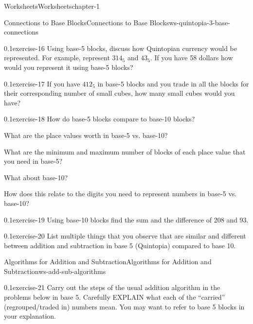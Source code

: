 \documentclass[twoside,11pt,]{book}
\begin{document}
\begin{chapterptx}{Worksheets}{}{Worksheets}{}{}{chapter-1}
\begin{worksheet-section-numberless}{Connections to Base Blocks}{}{Connections to Base Blocks}{}{}{ws-quintopia-3-base-connections}
\begin{divisionexercise}{1}{}{0.1}{exercise-16}
\hypertarget{p-31}{}%
Using base-5 blocks, discuss how Quintopian currency would be represented. For example, represent \(314_{5}\) and \(43_{5}\). If you have \textdollar{}58 dollars how would you represent it using base-5 blocks?%
\end{divisionexercise}%
\begin{divisionexercise}{2}{}{0.1}{exercise-17}%
\hypertarget{p-32}{}%
If you have \(412_{5}\) in base-5 blocks and you trade in all the blocks for their corresponding number of small cubes, how many small cubes would you have?%
\end{divisionexercise}%
\begin{divisionexercise}{3}{}{0.1}{exercise-18}%
\hypertarget{p-33}{}%
How do base-5 blocks compare to base-10 blocks?%
\par
\hypertarget{p-34}{}%
What are the place values worth in base-5 vs. base-10?%
\par
\hypertarget{p-35}{}%
What are the minimum and maximum number of blocks of each place value that you need in base-5?%
\par
\hypertarget{p-36}{}%
What about base-10?%
\par
\hypertarget{p-37}{}%
How does this relate to the digits you need to represent numbers in base-5 vs. base-10?%
\end{divisionexercise}%
\begin{divisionexercise}{4}{}{0.1}{exercise-19}%
\hypertarget{p-38}{}%
Using base-10 blocks find the sum and the difference of 208 and 93.%
\end{divisionexercise}%
\begin{divisionexercise}{5}{}{0.1}{exercise-20}%
\hypertarget{p-39}{}%
List multiple things that you observe that are similar and different between addition and subtraction in base 5 (Quintopia) compared to base 10.%
\end{divisionexercise}%
\end{worksheet-section-numberless}
\restoregeometry
%
%
\typeout{************************************************}
\typeout{************************************************}
%
\begin{worksheet-section-numberless}{Algorithms for Addition and Subtraction}{}{Algorithms for Addition and Subtraction}{}{}{ws-add-sub-algorithms}
\begin{divisionexercise}{1}{}{0.1}{exercise-21}%
\hypertarget{p-40}{}%
Carry out the steps of the usual addition algorithm in the problems below in base 5.  Carefully EXPLAIN what each of the ``carried'' (regrouped\slash{}traded in) numbers mean.  You may want to refer to base 5 blocks in your explanation.%

\end{divisionexercise}
\end{worksheet-section-numberless}
\end{chapterptx}
\end{document}
